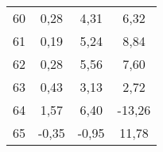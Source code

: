 \begin{table}[h]
\begin{tabular}{c|ccc}
60               & 0,28             & 4,31                 & 6,32                  \\
61               & 0,19             & 5,24                 & 8,84                  \\
62               & 0,28             & 5,56                 & 7,60                  \\
63               & 0,43             & 3,13                 & 2,72                  \\
64               & 1,57             & 6,40                 & -13,26                \\
65               & -0,35            & -0,95                & 11,78                 \\ \hline
\end{tabular}
\end{table}

\clearpage

